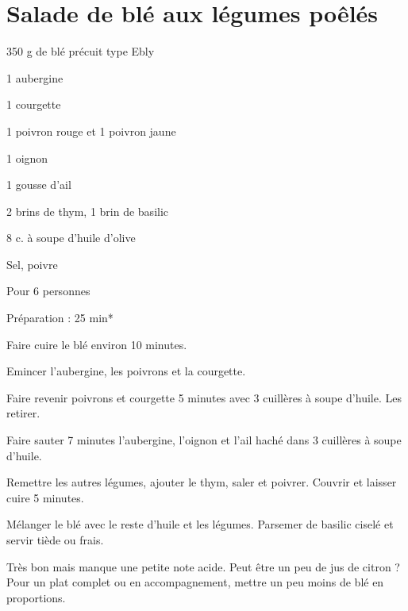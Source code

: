 \section[\normalsize{Salade de bl\'e aux l\'egumes po\^el\'es}]{Salade de bl\'e aux l\'egumes po\^el\'es}

\begin{ingredients}
\item 350 g de bl\'e pr\'ecuit type Ebly
\item 1 aubergine
\item 1 courgette
\item 1 poivron rouge et 1 poivron jaune
\item 1 oignon
\item 1 gousse d'ail
\item 2 brins de thym, 1 brin de basilic
\item 8 c. \`a soupe d'huile d'olive
\item Sel, poivre
\end{ingredients}
\begin{infos}
\item Pour 6 personnes
\item Préparation : 25 min*
\end{infos}
\begin{etapes}
\item Faire cuire le bl\'e environ 10 minutes.
\item Emincer l'aubergine, les poivrons et la courgette. 
\item Faire revenir poivrons et courgette 5 minutes avec 3 cuill\`eres \`a soupe d'huile. Les retirer.
\item Faire sauter 7 minutes l'aubergine, l'oignon et l'ail hach\'e dans 3 cuill\`eres \`a soupe d'huile. 
\item Remettre les autres l\'egumes, ajouter le thym, saler et poivrer. Couvrir et laisser cuire 5 minutes.
\item M\'elanger le bl\'e avec le reste d'huile et les l\'egumes. Parsemer de basilic cisel\'e et servir ti\`ede ou frais.
\end{etapes}
\begin{conseils}
Tr\`es bon mais manque une petite note acide. Peut \^etre un peu de jus de citron ?
Pour un plat complet ou en accompagnement, mettre un peu moins de bl\'e en proportions.
\end{conseils}
